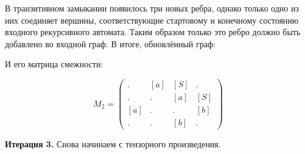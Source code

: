 \begin{example}
В транзитивном замыкании появилось три новых ребра, однако только одно из них соединяет вершины, соответствующие стартовому и конечному состоянию входного рекурсивного автомата.
Таким образом только это ребро должно быть добавлено во входной граф.
В итоге, обновлённый граф:
\begin{center}
\end{center}

И его матрица смежности:

$$ M_2 =
\begin{pmatrix} 
. & [a] & [S] & . \\
. & . & [a] & [S] \\
[a] & . & . & [b] \\
. & . & [b] & . 
\end{pmatrix}
$$

\textbf{Итерация 3.}
Снова начинаем с тензорного произведения.


\end{example}
